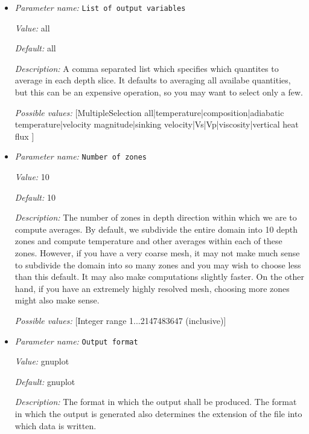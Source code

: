 \begin{itemize}
\item {\it Parameter name:} {\tt List of output variables}
\label{parameters:Postprocess/Depth average/List of output variables}


{\it Value:} all


{\it Default:} all


{\it Description:} A comma separated list which specifies which quantites to average in each depth slice. It defaults to averaging all availabe quantities, but this can be an expensive operation, so you may want to select only a few.


{\it Possible values:} [MultipleSelection all|temperature|composition|adiabatic temperature|velocity magnitude|sinking velocity|Vs|Vp|viscosity|vertical heat flux ]
\item {\it Parameter name:} {\tt Number of zones}
\label{parameters:Postprocess/Depth average/Number of zones}


{\it Value:} 10


{\it Default:} 10


{\it Description:} The number of zones in depth direction within which we are to compute averages. By default, we subdivide the entire domain into 10 depth zones and compute temperature and other averages within each of these zones. However, if you have a very coarse mesh, it may not make much sense to subdivide the domain into so many zones and you may wish to choose less than this default. It may also make computations slightly faster. On the other hand, if you have an extremely highly resolved mesh, choosing more zones might also make sense.


{\it Possible values:} [Integer range 1...2147483647 (inclusive)]
\item {\it Parameter name:} {\tt Output format}
\label{parameters:Postprocess/Depth average/Output format}


{\it Value:} gnuplot


{\it Default:} gnuplot


{\it Description:} The format in which the output shall be produced. The format in which the output is generated also determines the extension of the file into which data is written.



\end{itemize}
